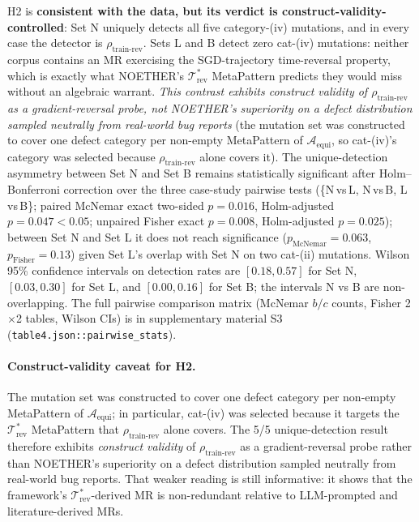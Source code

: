 \documentclass[acmsmall,screen,review]{acmart}
\begin{document}
H2 is \textbf{consistent with the data, but its verdict is construct-validity-controlled}: Set N uniquely detects all five category-(iv) mutations, and in every case the detector is $\rho_{\mathrm{train\text{-}rev}}$. Sets L and B detect zero cat-(iv) mutations: neither corpus contains an MR exercising the SGD-trajectory time-reversal property, which is exactly what NOETHER's $\mathcal{T}^{*}_{\mathrm{rev}}$ MetaPattern predicts they would miss without an algebraic warrant. \emph{This contrast exhibits construct validity of $\rho_{\mathrm{train\text{-}rev}}$ as a gradient-reversal probe, not NOETHER's superiority on a defect distribution sampled neutrally from real-world bug reports} (the mutation set was constructed to cover one defect category per non-empty MetaPattern of $\mathcal{A}_{\mathrm{equi}}$, so cat-(iv)'s category was selected because $\rho_{\mathrm{train\text{-}rev}}$ alone covers it). The unique-detection asymmetry between Set N and Set B remains statistically significant after Holm--Bonferroni correction over the three case-study pairwise tests (\{N\,vs\,L, N\,vs\,B, L\,vs\,B\}; paired McNemar exact two-sided $p = 0.016$, Holm-adjusted $p = 0.047 < 0.05$; unpaired Fisher exact $p = 0.008$, Holm-adjusted $p = 0.025$); between Set N and Set L it does not reach significance ($p_\mathrm{McNemar} = 0.063$, $p_\mathrm{Fisher} = 0.13$) given Set L's overlap with Set N on two cat-(ii) mutations. Wilson 95\% confidence intervals on detection rates are $[0.18, 0.57]$ for Set N, $[0.03, 0.30]$ for Set L, and $[0.00, 0.16]$ for Set B; the intervals N vs B are non-overlapping. The full pairwise comparison matrix (McNemar $b/c$ counts, Fisher 2$\times$2 tables, Wilson CIs) is in supplementary material S3 (\texttt{table4.json::pairwise\_stats}).

\paragraph{Construct-validity caveat for H2.}
The mutation set was constructed to cover one defect category per non-empty MetaPattern of $\mathcal{A}_{\mathrm{equi}}$; in particular, cat-(iv) was selected because it targets the $\mathcal{T}^{*}_{\mathrm{rev}}$ MetaPattern that $\rho_{\mathrm{train\text{-}rev}}$ alone covers. The 5/5 unique-detection result therefore exhibits \emph{construct validity} of $\rho_{\mathrm{train\text{-}rev}}$ as a gradient-reversal probe rather than NOETHER's superiority on a defect distribution sampled neutrally from real-world bug reports. That weaker reading is still informative: it shows that the framework's $\mathcal{T}^{*}_{\mathrm{rev}}$-derived MR is non-redundant relative to LLM-prompted and literature-derived MRs.
\end{document}

